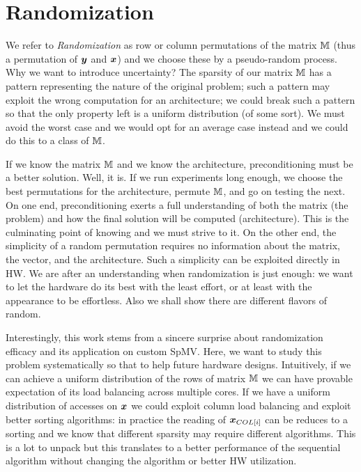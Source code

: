 \documentclass[manuscript,screen]{acmart}
\begin{document}
\section{Randomization}
\label{sec:randomization}
We refer to {\em Randomization} as row or column permutations of the
matrix $\mathbb{M}$ (thus a permutation of ${\boldsymbol y}$ and ${\boldsymbol x}$) and we choose
these by a pseudo-random process. Why we want to introduce
uncertainty? The sparsity of our matrix $\mathbb{M}$ has a pattern
representing the nature of the original problem; such a pattern may
exploit the wrong computation for an architecture; we could break such
a pattern so that the only property left is a uniform distribution (of
some sort). We must avoid the worst case and we would opt for an
average case instead and we could do this to a class of $\mathbb{M}$. 

If we know the matrix $\mathbb{M}$ and we know the architecture,
preconditioning must be a better solution.  Well, it is. If we run
experiments long enough, we choose the best permutations for the
architecture, permute $\mathbb{M}$, and go on testing the next.  On one end,
preconditioning exerts a full understanding of both the matrix (the
problem) and how the final solution will be computed
(architecture). This is the culminating point of knowing and we must
strive to it. On the other end, the simplicity of a random permutation
requires no information about the matrix, the vector, and the
architecture. Such a simplicity can be exploited directly in HW. We
are after an understanding when randomization is just enough: we want
to let the hardware do its best with the least effort, or at least
with the appearance to be effortless. Also we shall show there are
different flavors of random.


Interestingly, this work stems from a sincere surprise about
randomization efficacy and its application on custom SpMV. Here, we
want to study this problem systematically so that to help future
hardware designs. Intuitively, if we can achieve a uniform
distribution of the rows of matrix $\mathbb{M}$ we can have provable
expectation of its load balancing across multiple cores. If we have a
uniform distribution of accesses on ${\boldsymbol x}$ we could exploit column
load balancing and exploit better sorting algorithms: in practice the
reading of ${\boldsymbol x}_{COL[i]}$ can be reduces to a sorting and we know
that different sparsity may require different algorithms. This is a
lot to unpack but this translates to a better performance of the
sequential algorithm without changing the algorithm or better HW
utilization.
\end{document}
